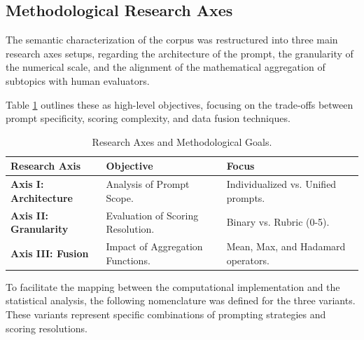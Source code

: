 \subsection{Methodological Research Axes}

The semantic characterization of the corpus was restructured into three main research axes setups, regarding  the architecture of the prompt, the granularity of the numerical scale, and the alignment of the mathematical aggregation of subtopics with human evaluators.

Table \ref{tab:research_axes} outlines these as  high-level objectives, focusing on the trade-offs between prompt specificity, scoring complexity, and data fusion techniques.



\begin{table}[htbp]
\centering
\caption{Research Axes and Methodological Goals.}
\label{tab:research_axes}
\begin{tabular}{@{}lp{5cm}p{5cm}@{}}
\toprule
\textbf{Research Axis} & \textbf{Objective} & \textbf{Focus} \\ \midrule
\textbf{Axis I: Architecture} & Analysis of Prompt Scope. & Individualized vs. Unified prompts. \\
\textbf{Axis II: Granularity} & Evaluation of Scoring Resolution. & Binary vs. Rubric (0-5). \\
\textbf{Axis III: Fusion} & Impact of Aggregation Functions. & Mean, Max, and Hadamard operators. \\ \bottomrule
\end{tabular}
\end{table}

To facilitate the mapping between the computational implementation and the statistical analysis, the following nomenclature was defined for the three variants. These variants represent specific combinations of prompting strategies and scoring resolutions.

